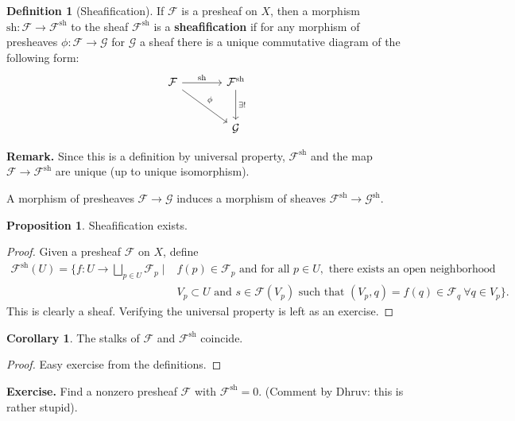 \documentclass{article}
\theoremstyle{definition}
\newtheorem{cor}[theorem]{Corollary}
\newtheorem{prop}[theorem]{Proposition}
\newtheorem{defn}{Definition}[section]
\begin{document}
\begin{defn}[Sheafification]
    If $\mathcal{F}$ is a presheaf on $X$, then a morphism $\text{sh}: \mathcal{F} \to \mathcal{F}^{\text{sh}}$ to the sheaf $\mathcal{F}^{\text{sh}}$ is a \textbf{sheafification} if for any morphism of presheaves $\phi : \mathcal{F} \to \mathcal{G}$ for $\mathcal{G}$ a sheaf there is a unique commutative diagram of the following form:
    \[\begin{tikzcd}[row sep=large,column sep=large]
        \mathcal{F} & \mathcal{F}^{\text{sh}} \\
         & \mathcal{G}
        \arrow["\text{sh}", from=1-1, to=1-2]
        \arrow["\exists !", from=1-2, to=2-2]
        \arrow["\phi", from=1-1, to=2-2]
    \end{tikzcd}\]
\end{defn}
\textbf{Remark.} Since this is a definition by universal property, $\mathcal{F}^{\text{sh}}$ and the map $\mathcal{F} \to \mathcal{F}^{\text{sh}}$ are unique (up to unique isomorphism).
\vspace{1mm}
 
A morphism of presheaves $\mathcal{F} \to \mathcal{G}$ induces a morphism of sheaves $\mathcal{F}^{\text{sh}} \to \mathcal{G}^{\text{sh}}$.

\begin{prop}
    Sheafification exists.
\end{prop}
\begin{proof}
    Given a presheaf $\mathcal{F}$ on $X$, define 
    \begin{align*}
        \mathcal{F}^{\text{sh}}(U) = \{f : U \to \bigsqcup_{p \in U}^{} \mathcal{F}_p \mid& f(p) \in \mathcal{F}_p \text{ and for all } p \in U, \text{ there exists an open neighborhood }\\&V_p \subset U \text{ and }s \in \mathcal{F}(V_p) \text{ such that } (V_p, q) = f(q) \in \mathcal{F}_q ~\forall q \in V_p\}.
    \end{align*}
    This is clearly a sheaf. Verifying the universal property is left as an exercise.
\end{proof}
\begin{cor}
    The stalks of $\mathcal{F}$ and $\mathcal{F}^{\text{sh}}$ coincide.
\end{cor}
\begin{proof}
    Easy exercise from the definitions.
\end{proof}
\textbf{Exercise.} Find a nonzero presheaf $\mathcal{F}$ with $\mathcal{F}^{\text{sh}} = 0$. (Comment by Dhruv: this is rather stupid). 
\end{document}
